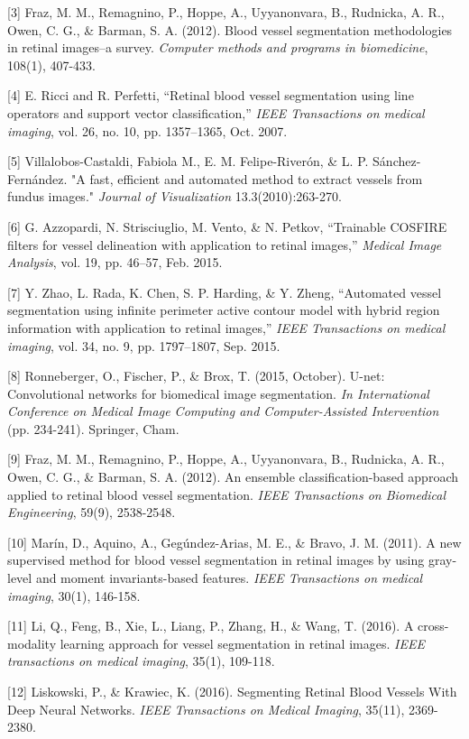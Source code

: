\documentclass{article}
\begin{document}
[3] Fraz, M. M., Remagnino, P., Hoppe, A., Uyyanonvara, B., Rudnicka, A. R., Owen, C. G., \& Barman, S. A. (2012). Blood vessel segmentation methodologies in retinal images–a survey. {\it Computer methods and programs in biomedicine}, 108(1), 407-433.


[4] E. Ricci and R. Perfetti, “Retinal blood vessel segmentation using line operators and support vector classification,” {\it IEEE Transactions on medical imaging}, vol. 26, no. 10, pp. 1357–1365, Oct. 2007. 

[5] Villalobos-Castaldi, Fabiola M., E. M. Felipe-Riverón, \& L. P. Sánchez-Fernández. "A fast, efficient and automated method to extract vessels from fundus images." {\it Journal of Visualization} 13.3(2010):263-270.

[6] G. Azzopardi, N. Strisciuglio, M. Vento, \& N. Petkov, “Trainable COSFIRE filters for vessel delineation with application to retinal images,” {\it Medical Image Analysis}, vol. 19, pp. 46–57, Feb. 2015.

[7] Y. Zhao, L. Rada, K. Chen, S. P. Harding, \& Y. Zheng, “Automated vessel segmentation using infinite perimeter active contour model with hybrid region information with application to retinal images,” {\it IEEE Transactions on medical imaging}, vol. 34, no. 9, pp. 1797–1807, Sep. 2015.



[8] Ronneberger, O., Fischer, P., \& Brox, T. (2015, October). U-net: Convolutional networks for biomedical image segmentation. {\it In International Conference on Medical Image Computing and Computer-Assisted Intervention} (pp. 234-241). Springer, Cham.

[9] Fraz, M. M., Remagnino, P., Hoppe, A., Uyyanonvara, B., Rudnicka, A. R., Owen, C. G., \& Barman, S. A. (2012). An ensemble classification-based approach applied to retinal blood vessel segmentation. {\it IEEE Transactions on Biomedical Engineering}, 59(9), 2538-2548.
 
[10] Marín, D., Aquino, A., Gegúndez-Arias, M. E., \& Bravo, J. M. (2011). A new supervised method for blood vessel segmentation in retinal images by using gray-level and moment invariants-based features. {\it IEEE Transactions on medical imaging}, 30(1), 146-158.

[11] Li, Q., Feng, B., Xie, L., Liang, P., Zhang, H., \& Wang, T. (2016). A cross-modality learning approach for vessel segmentation in retinal images. {\it IEEE transactions on medical imaging}, 35(1), 109-118.

[12] Liskowski, P., \& Krawiec, K. (2016). Segmenting Retinal Blood Vessels With Deep Neural Networks. {\it IEEE Transactions on Medical Imaging}, 35(11), 2369-2380.
\end{document}
